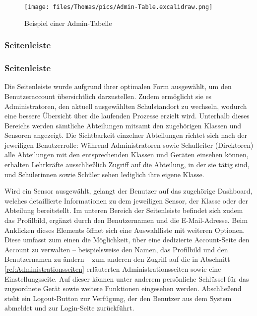 \begin{inhalt}
\begin{figure}[!htb] 
\centering 
\texttt{[image: files/Thomas/pics/Admin-Table.excalidraw.png]} 
\caption[Bildbezeichnung für Abbildungsverzeichnis]{Beispiel einer Admin-Tabelle} 
\label{fig:gehaeuse_internet_bild} 
\end{figure}

\subsubsection{Seitenleiste}

\subsubsection{Seitenleiste}

Die Seitenleiste wurde aufgrund ihrer optimalen Form ausgewählt, um den Benutzeraccount übersichtlich darzustellen. Zudem ermöglicht sie es Administratoren, den aktuell ausgewählten Schulstandort zu wechseln, wodurch eine bessere Übersicht über die laufenden Prozesse erzielt wird. Unterhalb dieses Bereichs werden sämtliche Abteilungen mitsamt den zugehörigen Klassen und Sensoren angezeigt. Die Sichtbarkeit einzelner Abteilungen richtet sich nach der jeweiligen Benutzerrolle: Während Administratoren sowie Schulleiter (Direktoren) alle Abteilungen mit den entsprechenden Klassen und Geräten einsehen können, erhalten Lehrkräfte ausschließlich Zugriff auf die Abteilung, in der sie tätig sind, und Schülerinnen sowie Schüler sehen lediglich ihre eigene Klasse. 

Wird ein Sensor ausgewählt, gelangt der Benutzer auf das zugehörige Dashboard, welches detaillierte Informationen zu dem jeweiligen Sensor, der Klasse oder der Abteilung bereitstellt. Im unteren Bereich der Seitenleiste befindet sich zudem das Profilbild, ergänzt durch den Benutzernamen und die E-Mail-Adresse. Beim Anklicken dieses Elements öffnet sich eine Auswahlliste mit weiteren Optionen. Diese umfasst zum einen die Möglichkeit, über eine dedizierte Account-Seite den Account zu verwalten – beispielsweise den Namen, das Profilbild und den Benutzernamen zu ändern – zum anderen den Zugriff auf die in Abschnitt \ref{ref:Administrationsseiten} erläuterten Administrationsseiten sowie eine Einstellungsseite. Auf dieser können unter anderem persönliche Schlüssel für das zugeordnete Gerät sowie weitere Funktionen eingesehen werden. Abschließend steht ein Logout-Button zur Verfügung, der den Benutzer aus dem System abmeldet und zur Login-Seite zurückführt.


\end{inhalt}
